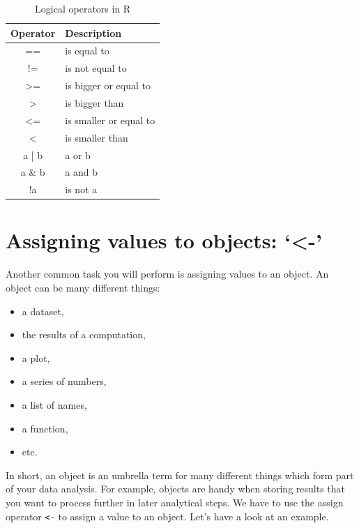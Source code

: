 \documentclass[
  letterpaper,
  DIV=11,
  numbers=noendperiod]{scrreprt}
\begin{document}
\begingroup
\fontsize{12.0pt}{14.4pt}\selectfont

\begin{longtable}{cl}

\caption{\label{tbl-logical-operators-r}Logical operators in R}

\tabularnewline

\toprule
Operator & Description \\ 
\midrule\addlinespace[2.5pt]
== & is equal to \\ 
!= & is not equal to \\ 
>= & is bigger or equal to \\ 
> & is bigger than \\ 
<= & is smaller or equal to \\ 
< & is smaller than \\ 
a | b & a or b \\ 
a \& b & a and b \\ 
!a & is not a \\ 
\bottomrule

\end{longtable}

\endgroup

\section{Assigning values to objects:
`\textless-'}\label{sec-assigning-values-to-objects}

Another common task you will perform is assigning values to an object.
An object can be many different things:

\begin{itemize}
\item
  a dataset,
\item
  the results of a computation,
\item
  a plot,
\item
  a series of numbers,
\item
  a list of names,
\item
  a function,
\item
  etc.
\end{itemize}

In short, an object is an umbrella term for many different things which
form part of your data analysis. For example, objects are handy when
storing results that you want to process further in later analytical
steps. We have to use the assign operator \texttt{\textless{}-} to
assign a value to an object. Let's have a look at an example.
\end{document}
